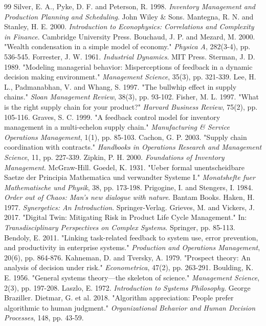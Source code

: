 \documentclass[11pt,a4paper]{article}
\begin{document}
\begin{thebibliography}{99}
 Silver, E. A., Pyke, D. F. and Peterson, R. 1998. \textit{Inventory Management and Production Planning and Scheduling}. John Wiley \& Sons.
 Mantegna, R. N. and Stanley, H. E. 2000. \textit{Introduction to Econophysics: Correlations and Complexity in Finance}. Cambridge University Press.
 Bouchaud, J. P. and Mezard, M. 2000. "Wealth condensation in a simple model of economy." \textit{Physica A}, 282(3-4), pp. 536-545.
 Forrester, J. W. 1961. \textit{Industrial Dynamics}. MIT Press.
 Sterman, J. D. 1989. "Modeling managerial behavior: Misperceptions of feedback in a dynamic decision making environment." \textit{Management Science}, 35(3), pp. 321-339.
 Lee, H. L., Padmanabhan, V. and Whang, S. 1997. "The bullwhip effect in supply chains." \textit{Sloan Management Review}, 38(3), pp. 93-102.
 Fisher, M. L. 1997. "What is the right supply chain for your product?" \textit{Harvard Business Review}, 75(2), pp. 105-116.
 Graves, S. C. 1999. "A feedback control model for inventory management in a multi-echelon supply chain." \textit{Manufacturing \& Service Operations Management}, 1(1), pp. 85-103.
 Cachon, G. P. 2003. "Supply chain coordination with contracts." \textit{Handbooks in Operations Research and Management Science}, 11, pp. 227-339.
 Zipkin, P. H. 2000. \textit{Foundations of Inventory Management}. McGraw-Hill.
 Goedel, K. 1931. "Ueber formal unentscheidbare Saetze der Principia Mathematica und verwandter Systeme I." \textit{Monatshefte fuer Mathematische und Physik}, 38, pp. 173-198.
 Prigogine, I. and Stengers, I. 1984. \textit{Order out of Chaos: Man's new dialogue with nature}. Bantam Books.
 Haken, H. 1977. \textit{Synergetics: An Introduction}. Springer-Verlag.
 Grieves, M. and Vickers, J. 2017. "Digital Twin: Mitigating Risk in Product Life Cycle Management." In: \textit{Transdisciplinary Perspectives on Complex Systems}. Springer, pp. 85-113.
 Bendoly, E. 2011. "Linking task-related feedback to system use, error prevention, and productivity in enterprise systems." \textit{Production and Operations Management}, 20(6), pp. 864-876.
 Kahneman, D. and Tversky, A. 1979. "Prospect theory: An analysis of decision under risk." \textit{Econometrica}, 47(2), pp. 263-291.
 Boulding, K. E. 1956. "General systems theory—the skeleton of science." \textit{Management Science}, 2(3), pp. 197-208.
 Laszlo, E. 1972. \textit{Introduction to Systems Philosophy}. George Braziller.
 Dietmar, G. et al. 2018. "Algorithm appreciation: People prefer algorithmic to human judgment." \textit{Organizational Behavior and Human Decision Processes}, 148, pp. 43-59.
\end{thebibliography}
\end{document}
